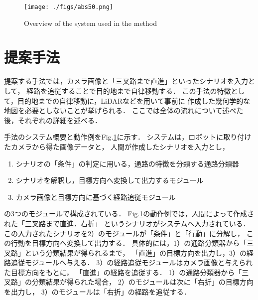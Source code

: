 \documentclass{sice-si}
\begin{document}

\begin{figure}[t]
    \centering
     \texttt{[image: ./figs/abs50.png]}
     \caption{Overview of the system used in the method}\label{fig:system}
\end{figure}
\section{提案手法}
提案する手法では，カメラ画像と「三叉路まで直進」といったシナリオを入力として，
経路を追従することで目的地まで自律移動する．
この手法の特徴として，目的地までの自律移動に，LiDARなどを用いて事前に
作成した幾何学的な地図を必要としないことが挙げられる．
ここでは全体の流れについて述べた後，それぞれの詳細を述べる．
\par
手法のシステム概要と動作例をFig.\ref{fig:system}に示す．
システムは，ロボットに取り付けたカメラから得た画像データと，
人間が作成したシナリオを入力とし，
\begin{enumerate}
    \item [1）] シナリオの「条件」の判定に用いる，通路の特徴を分類する通路分類器
    \item [2）] シナリオを解釈し，目標方向へ変換して出力するモジュール
    \item [3）] カメラ画像と目標方向に基づく経路追従モジュール\
\end{enumerate}
の3つのモジュールで構成されている．
Fig.\ref{fig:system}の動作例では，人間によって作成された「三叉路まで直進．右折」
というシナリオがシステムへ入力されている．
この入力されたシナリオを2）のモジュールが「条件」と「行動」に分解し，
この行動を目標方向へ変換して出力する．
具体的には，1）の通路分類器から「三叉路」という分類結果が得られるまで，
「直進」の目標方向を出力し，3）の経路追従モジュールへ与える．
3）の経路追従モジュールはカメラ画像と与えられた目標方向をもとに，
「直進」の経路を追従する．
1）の通路分類器から「三叉路」の分類結果が得られた場合，
2）のモジュールは次に「右折」の目標方向を出力し，
3）のモジュールは「右折」の経路を追従する．
\end{document}
